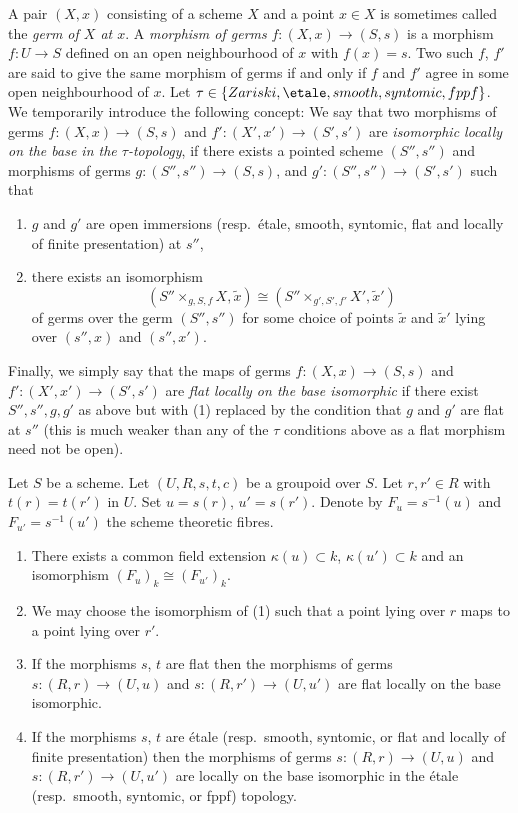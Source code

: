 \medskip\noindent
A pair $(X, x)$ consisting of a scheme $X$ and a point $x \in X$ is sometimes
called the {\it germ of $X$ at $x$}.
A {\it morphism of germs} $f : (X, x) \to (S, s)$
is a morphism $f : U \to S$ defined on an open neighbourhood
of $x$ with $f(x) = s$. Two such
$f$, $f'$ are said to give the same morphism of germs
if and only if $f$ and $f'$ agree in some open neighbourhood of $x$.
Let $\tau \in \{Zariski, \etale, smooth, syntomic, fppf\}$.
We temporarily introduce the following concept: We say that two morphisms
of germs $f : (X, x) \to (S, s)$ and $f' : (X', x') \to (S', s')$
are {\it isomorphic locally on the base in the $\tau$-topology},
if there exists a pointed scheme $(S'', s'')$ and morphisms of germs
$g : (S'', s'') \to (S, s)$, and $g' : (S'', s'') \to (S', s')$
such that
\begin{enumerate}
\item $g$ and $g'$ are open immersions (resp.\ \'etale, smooth, syntomic,
flat and locally of finite presentation) at $s''$,
\item there exists an isomorphism
$$
(S'' \times_{g, S, f} X, \tilde x)
\cong
(S'' \times_{g', S', f'} X', \tilde  x')
$$
of germs over the germ $(S'', s'')$ for some choice of points
$\tilde x$ and $\tilde x'$ lying over $(s'', x)$ and $(s'', x')$.
\end{enumerate}
Finally, we simply say that the maps of germs
$f : (X, x) \to (S, s)$ and $f' : (X', x') \to (S', s')$
are {\it flat locally on the base isomorphic} if there exist
$S'', s'', g, g'$ as above but with (1) replaced by
the condition that $g$ and $g'$ are flat at $s''$ (this is
much weaker than any of the $\tau$ conditions above
as a flat morphism need not be open).

\begin{lemma}
\label{lemma-two-fibres}
Let $S$ be a scheme.
Let $(U, R, s, t, c)$ be a groupoid over $S$.
Let $r, r' \in R$ with $t(r) = t(r')$ in $U$.
Set $u = s(r)$, $u' = s(r')$.
Denote by $F_u = s^{-1}(u)$ and $F_{u'} = s^{-1}(u')$ the scheme
theoretic fibres.
\begin{enumerate}
\item There exists a common field extension
$\kappa(u) \subset k$, $\kappa(u') \subset k$ and
an isomorphism $(F_u)_k \cong (F_{u'})_k$.
\item We may choose the isomorphism of (1) such that a point
lying over $r$ maps to a point lying over $r'$.
\item If the morphisms $s$, $t$ are flat then the morphisms of germs
$s : (R, r) \to (U, u)$ and $s : (R, r') \to (U, u')$ are flat
locally on the base isomorphic.
\item If the morphisms $s$, $t$ are \'etale
(resp.\ smooth, syntomic, or flat and locally of finite presentation)
then the morphisms of germs $s : (R, r) \to (U, u)$ and
$s : (R, r') \to (U, u')$ are locally on the base isomorphic
in the \'etale (resp.\ smooth, syntomic, or fppf) topology.
\end{enumerate}
\end{lemma}

